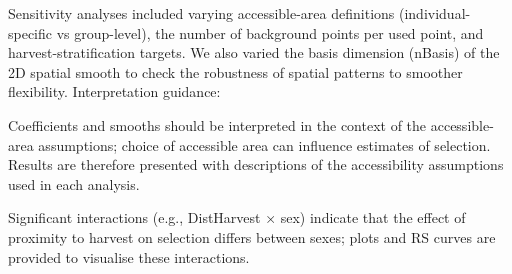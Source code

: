 \documentclass[
  letterpaper,
  DIV=11,
  numbers=noendperiod]{scrartcl}
\begin{document}
Sensitivity analyses included varying accessible-area definitions
(individual-specific vs group-level), the number of background points
per used point, and harvest-stratification targets. We also varied the
basis dimension (nBasis) of the 2D spatial smooth to check the
robustness of spatial patterns to smoother flexibility. Interpretation
guidance:

Coefficients and smooths should be interpreted in the context of the
accessible-area assumptions; choice of accessible area can influence
estimates of selection. Results are therefore presented with
descriptions of the accessibility assumptions used in each analysis.

Significant interactions (e.g., DistHarvest × sex) indicate that the
effect of proximity to harvest on selection differs between sexes; plots
and RS curves are provided to visualise these interactions.
\end{document}
